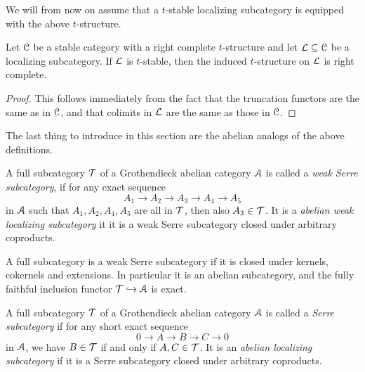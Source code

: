 

We will from now on assume that a $t$-stable localizing subcategory is equipped with the above $t$-structure. 

\begin{proposition}
    \label{ch3:prop:induced-t-structure-on-stable-localizing}
    Let $\EuScript{C}$ be a stable category with a right complete $t$-structure and let $\mathcal{L}\subseteq \EuScript{C}$ be a localizing subcategory. If $\mathcal{L}$ is $t$-stable, then the induced $t$-structure on $\mathcal{L}$ is right complete.  
\end{proposition}
\begin{proof}
    This follows immediately from the fact that the truncation functors are the same as in $\EuScript{C}$, and that colimits in $\mathcal{L}$ are the same as those in $\EuScript{C}$. 
\end{proof}

The last thing to introduce in this section are the abelian analogs of the above definitions. 

\begin{definition}
    A full subcategory $\mathcal{T}$ of a Grothendieck abelian category $\EuScript{A}$ is called a \emph{weak Serre subcategory}, if for any exact sequence 
    \[A_1 \to A_2 \to A_3 \to A_4 \to A_5\]
    in $\EuScript{A}$ such that $A_1, A_2, A_4, A_5$ are all in $\mathcal{T}$, then also $A_3 \in \mathcal{T}$. It is a \emph{abelian weak localizing subcategory} it it is a weak Serre subcategory closed under arbitrary coproducts. 
\end{definition}

\begin{remark}
    A full subcategory is a weak Serre subcategory if it is closed under kernels, cokernels and extensions. In particular it is an abelian subcategory, and the fully faithful inclusion functor $\mathcal{T}\hookrightarrow \EuScript{A}$ is exact. 
\end{remark}

\begin{definition}
    A full subcategory $\mathcal{T}$ of a Grothendieck abelian category $\EuScript{A}$ is called a \emph{Serre subcategory} if for any short exact sequence 
    \[0\to A\to B\to C\to 0\]
    in $\EuScript{A}$, we have $B\in \mathcal{T}$ if and only if $A, C \in \mathcal{T}$. It is an \emph{abelian localizing subcategory} if it is a Serre subcategory closed under arbitrary coproducts. 
\end{definition}

